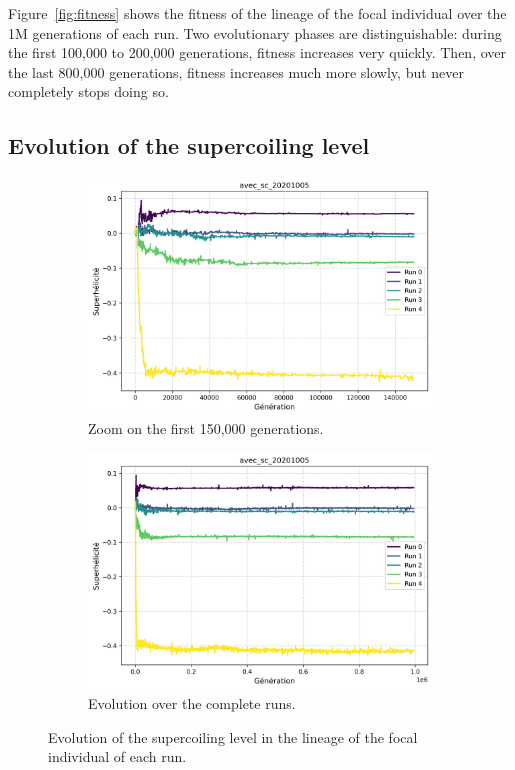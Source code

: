 Figure~\ref{fig:fitness} shows the fitness of the lineage of the focal individual over the 1M generations of each run.
Two evolutionary phases are distinguishable: during the first 100,000 to 200,000 generations, fitness increases very quickly.
Then, over the last 800,000 generations, fitness increases much more slowly, but never completely stops doing so.


\subsection{Evolution of the supercoiling level}

\begin{figure}[!h]
  \centering
  \begin{subfigure}[b]{0.49\textwidth}
    \includegraphics[width=\textwidth]{aevol/images/superhelicite_agrege_zoom.png}
    \caption{Zoom on the first 150,000 generations.}
    \label{fig:sc_zoom}
  \end{subfigure}
  \begin{subfigure}[b]{0.49\textwidth}
    \includegraphics[width=\textwidth]{aevol/images/superhelicite_agrege.png}
    \caption{Evolution over the complete runs.}
    \label{fig:sc_all}
  \end{subfigure}
  \caption{Evolution of the supercoiling level in the lineage of the focal individual of each run.}
  \label{fig:sc}
\end{figure}

